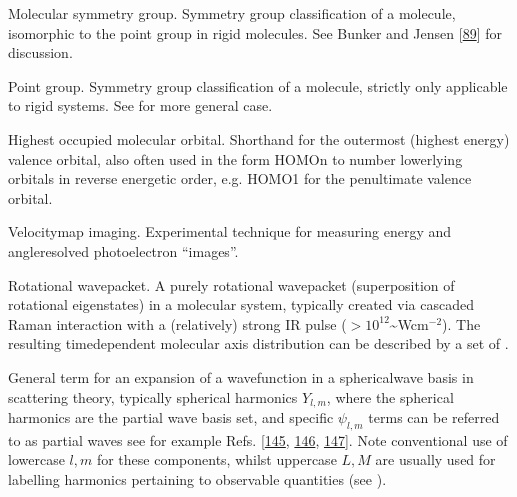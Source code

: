 \documentclass[letterpaper,table,10pt,english]{jupyterBook}
\begin{document}
\begin{description}
\sphinxAtStartPar
Molecular symmetry group. Symmetry group classification of a molecule, isomorphic to the point group in rigid molecules. See Bunker and Jensen {[}\hyperlink{cite.backmatter/bibliography:id548}{89}{]} for discussion.

\sphinxAtStartPar
Point group. Symmetry group classification of a molecule, strictly only applicable to rigid systems. See {\hyperref[\detokenize{backmatter/glossary:term-MS}]{}} for more general case.

\sphinxAtStartPar
Highest occupied molecular orbital. Short\sphinxhyphen{}hand for the outermost (highest energy) valence orbital, also often used in the form HOMO\sphinxhyphen{}n to number lower\sphinxhyphen{}lying orbitals in reverse energetic order, e.g. HOMO\sphinxhyphen{}1 for the penultimate valence orbital.

\sphinxAtStartPar
Velocity\sphinxhyphen{}map imaging. Experimental technique for measuring energy and angle\sphinxhyphen{}resolved photoelectron “images”.

\sphinxAtStartPar
Rotational wavepacket. A purely rotational wavepacket (superposition of rotational eigenstates) in a molecular system, typically created via cascaded Raman interaction with a (relatively) strong IR pulse (\(>10^{12}\)\textasciitilde{}Wcm\(^{-2}\)). The resulting time\sphinxhyphen{}dependent molecular axis distribution can be described by a set of {\hyperref[\detokenize{backmatter/glossary:term-ADMs}]{}}.

\sphinxAtStartPar
General term for an expansion of a wavefunction in a spherical\sphinxhyphen{}wave basis in scattering theory, typically spherical harmonics \(Y_{l,m}\), where the spherical harmonics are the partial wave basis set, and specific \(\psi_{l,m}\) terms can be referred to as partial waves \sphinxhyphen{} see for example Refs. {[}\hyperlink{cite.backmatter/bibliography:id740}{145}, \hyperlink{cite.backmatter/bibliography:id789}{146}, \hyperlink{cite.backmatter/bibliography:id868}{147}{]}. Note conventional use of lower\sphinxhyphen{}case \(l,m\) for these components, whilst upper\sphinxhyphen{}case \(L,M\) are usually used for labelling harmonics pertaining to observable quantities (see {\hyperref[\detokenize{backmatter/glossary:term-anisotropy-paramters}]{}}).


\end{description}
\end{document}
